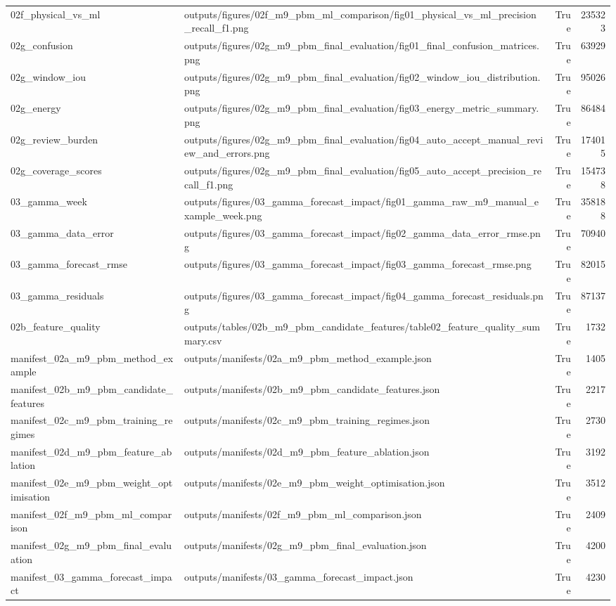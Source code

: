 \begin{tabular}{llrr}
02f_physical_vs_ml & outputs/figures/02f_m9_pbm_ml_comparison/fig01_physical_vs_ml_precision_recall_f1.png & True & 235323 \\
02g_confusion & outputs/figures/02g_m9_pbm_final_evaluation/fig01_final_confusion_matrices.png & True & 63929 \\
02g_window_iou & outputs/figures/02g_m9_pbm_final_evaluation/fig02_window_iou_distribution.png & True & 95026 \\
02g_energy & outputs/figures/02g_m9_pbm_final_evaluation/fig03_energy_metric_summary.png & True & 86484 \\
02g_review_burden & outputs/figures/02g_m9_pbm_final_evaluation/fig04_auto_accept_manual_review_and_errors.png & True & 174015 \\
02g_coverage_scores & outputs/figures/02g_m9_pbm_final_evaluation/fig05_auto_accept_precision_recall_f1.png & True & 154738 \\
03_gamma_week & outputs/figures/03_gamma_forecast_impact/fig01_gamma_raw_m9_manual_example_week.png & True & 358188 \\
03_gamma_data_error & outputs/figures/03_gamma_forecast_impact/fig02_gamma_data_error_rmse.png & True & 70940 \\
03_gamma_forecast_rmse & outputs/figures/03_gamma_forecast_impact/fig03_gamma_forecast_rmse.png & True & 82015 \\
03_gamma_residuals & outputs/figures/03_gamma_forecast_impact/fig04_gamma_forecast_residuals.png & True & 87137 \\
02b_feature_quality & outputs/tables/02b_m9_pbm_candidate_features/table02_feature_quality_summary.csv & True & 1732 \\
manifest_02a_m9_pbm_method_example & outputs/manifests/02a_m9_pbm_method_example.json & True & 1405 \\
manifest_02b_m9_pbm_candidate_features & outputs/manifests/02b_m9_pbm_candidate_features.json & True & 2217 \\
manifest_02c_m9_pbm_training_regimes & outputs/manifests/02c_m9_pbm_training_regimes.json & True & 2730 \\
manifest_02d_m9_pbm_feature_ablation & outputs/manifests/02d_m9_pbm_feature_ablation.json & True & 3192 \\
manifest_02e_m9_pbm_weight_optimisation & outputs/manifests/02e_m9_pbm_weight_optimisation.json & True & 3512 \\
manifest_02f_m9_pbm_ml_comparison & outputs/manifests/02f_m9_pbm_ml_comparison.json & True & 2409 \\
manifest_02g_m9_pbm_final_evaluation & outputs/manifests/02g_m9_pbm_final_evaluation.json & True & 4200 \\
manifest_03_gamma_forecast_impact & outputs/manifests/03_gamma_forecast_impact.json & True & 4230 \\
\bottomrule
\end{tabular}
